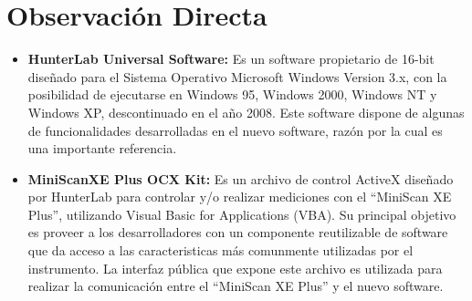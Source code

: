	\section{Observaci\'{o}n Directa}
		\begin{itemize}
			\item \textbf{HunterLab Universal Software:} Es un software propietario de 16-bit dise\~{n}ado para el Sistema Operativo Microsoft Windows Version 3.x, con la posibilidad de ejecutarse en Windows 95, Windows 2000, Windows NT y Windows XP, descontinuado en el a\~{n}o 2008. Este software dispone de algunas de funcionalidades desarrolladas en el nuevo software, raz\'{o}n por la cual es una importante referencia.
		
			\item \textbf{MiniScanXE Plus OCX Kit:} Es un archivo de control ActiveX dise\~{n}ado por HunterLab para controlar y/o realizar mediciones con el ``MiniScan XE Plus'', utilizando Visual Basic for Applications (VBA). Su principal objetivo es proveer a los desarrolladores con un componente reutilizable de software que da acceso a las caracteristicas m\'{a}s comunmente utilizadas por el instrumento. La interfaz p\'{u}blica que expone este archivo es utilizada para realizar la comunicaci\'{o}n entre el ``MiniScan XE Plus'' y el nuevo software.
		\end{itemize}